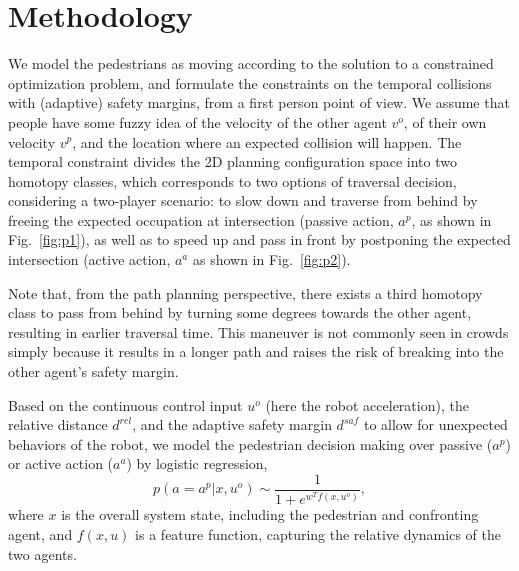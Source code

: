 \documentclass[conference]{IEEEtran}
\begin{document}
\section{Methodology}
We model the pedestrians as moving according to the solution to a constrained optimization 
problem, and formulate the constraints on the temporal collisions with 
(adaptive) safety margins, from a first person point of view. We assume that 
people have some fuzzy idea of the velocity of the other agent $v^o$, of their 
own velocity $v^p$, and the location where an expected collision will happen. 
The temporal constraint divides the 2D planning configuration space into two 
homotopy classes, which corresponds to two options of traversal decision, 
considering a two-player scenario: to slow down and traverse from behind by 
freeing the expected occupation at intersection (passive action, $a^{p}$, as 
shown in Fig.~\ref{fig:p1}), as well as to speed up and pass in front by postponing 
the expected intersection (active action, $a^a$ as shown in Fig.~\ref{fig:p2}).   

Note that, from the path planning perspective, there exists a third homotopy 
class to pass from behind by turning some degrees towards the other agent, 
resulting in earlier traversal time. This maneuver is not commonly seen in 
crowds simply 
because it results in a longer path and raises the risk of breaking into the 
other agent's safety margin. 

Based on the continuous control input $u^o$ (here the robot acceleration), the 
relative distance $d^{rel}$, and the adaptive safety margin $d^{saf}$ to 
allow for unexpected behaviors of the robot, we model the pedestrian 
decision making over passive ($a^p$) or active action ($a^a$) by logistic regression,
\begin{equation}
p(a=a^p|x,u^o) \sim \frac{1}{1+e^{w^Tf(x,u^o)}}, 
\end{equation}
where $x$ is the overall system state, including the pedestrian and confronting agent, and $f(x,u)$ is a feature function, capturing the relative dynamics of the two agents.
\end{document}
